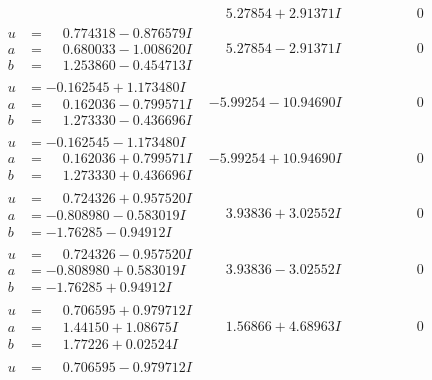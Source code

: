 \documentclass[1p]{elsarticle_modified}
\theoremstyle{definition}
\begin{document}
$$\begin{array}{c|c|c}
 & \phantom{-}5.27854 + 2.91371 I & \phantom{-0.000000 } 0 \\ \hline\begin{aligned}
u &= \phantom{-}0.774318 - 0.876579 I \\
a &= \phantom{-}0.680033 - 1.008620 I \\
b &= \phantom{-}1.253860 - 0.454713 I\end{aligned}
 & \phantom{-}5.27854 - 2.91371 I & \phantom{-0.000000 } 0 \\ \hline\begin{aligned}
u &= -0.162545 + 1.173480 I \\
a &= \phantom{-}0.162036 - 0.799571 I \\
b &= \phantom{-}1.273330 - 0.436696 I\end{aligned}
 & -5.99254 - 10.94690 I & \phantom{-0.000000 } 0 \\ \hline\begin{aligned}
u &= -0.162545 - 1.173480 I \\
a &= \phantom{-}0.162036 + 0.799571 I \\
b &= \phantom{-}1.273330 + 0.436696 I\end{aligned}
 & -5.99254 + 10.94690 I & \phantom{-0.000000 } 0 \\ \hline\begin{aligned}
u &= \phantom{-}0.724326 + 0.957520 I \\
a &= -0.808980 - 0.583019 I \\
b &= -1.76285 - 0.94912 I\end{aligned}
 & \phantom{-}3.93836 + 3.02552 I & \phantom{-0.000000 } 0 \\ \hline\begin{aligned}
u &= \phantom{-}0.724326 - 0.957520 I \\
a &= -0.808980 + 0.583019 I \\
b &= -1.76285 + 0.94912 I\end{aligned}
 & \phantom{-}3.93836 - 3.02552 I & \phantom{-0.000000 } 0 \\ \hline\begin{aligned}
u &= \phantom{-}0.706595 + 0.979712 I \\
a &= \phantom{-}1.44150 + 1.08675 I \\
b &= \phantom{-}1.77226 + 0.02524 I\end{aligned}
 & \phantom{-}1.56866 + 4.68963 I & \phantom{-0.000000 } 0 \\ \hline\begin{aligned}
u &= \phantom{-}0.706595 - 0.979712 I \\

\end{aligned}
\end{array}$$
\end{document}
